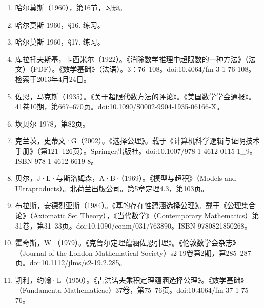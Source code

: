 \begin{enumerate}
\item 哈尔莫斯（1960），第16节，习题。
\item 哈尔莫斯 1960，§16. 练习。
\item 哈尔莫斯 1960，§17. 练习。
\item 库拉托夫斯基，卡西米尔（1922）。《消除数学推理中超限数的一种方法》（法文）（PDF）。《数学基础》（法语）。3：76–108。doi:10.4064/fm-3-1-76-108。检索于2013年4月24日。
\item 佐恩，马克斯（1935）。《关于超限代数方法的评论》。《美国数学学会通报》。41卷10期，第667–670页。doi:10.1090/S0002-9904-1935-06166-X。
\item 坎贝尔 1978，第82页。
\item 克兰茨，史蒂文·G（2002）。《选择公理》。载于《计算机科学逻辑与证明技术手册》（第121–126页）。Springer出版社。doi:10.1007/978-1-4612-0115-1_9。ISBN 978-1-4612-6619-8。
\item 贝尔，J·L·与斯洛姆森，A·B·（1969）。《模型与超积》（Models and Ultraproducts）。北荷兰出版公司。第5章定理4.3，第103页。
\item 布拉斯，安德烈亚斯（1984）。《基的存在性蕴涵选择公理》。载于《公理集合论》（Axiomatic Set Theory），《当代数学》（Contemporary Mathematics）第31卷，第31–33页。doi:10.1090/conm/031/763890。ISBN 9780821850268。
\item 霍奇斯，W·（1979）。《克鲁尔定理蕴涵佐恩引理》。《伦敦数学会杂志》（Journal of the London Mathematical Society）s2-19卷第2期，第285–287页。doi:10.1112/jlms/s2-19.2.285。
\item 凯利，约翰·L（1950）。《吉洪诺夫乘积定理蕴涵选择公理》。《数学基础》（Fundamenta Mathematicae）37卷，第75–76页。doi:10.4064/fm-37-1-75-76。
\end{enumerate}